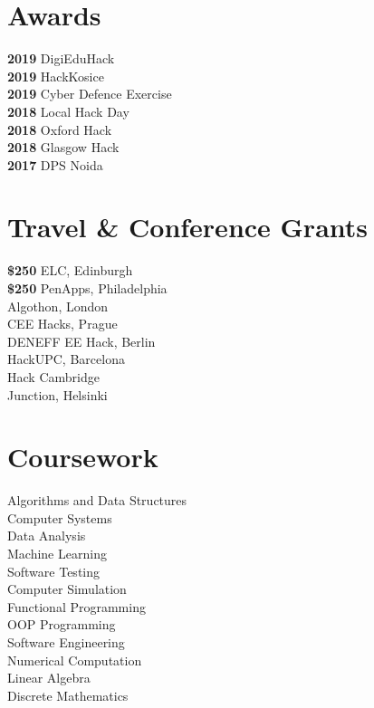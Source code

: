 \documentclass[]{deedy-resume-openfont}
\begin{document}
\begin{minipage}[t]{0.66\textwidth}
%
%


\end{minipage}%
\hfill
\begin{minipage}[t]{0.33\textwidth} 


\section{Awards} 

\textbf{2019 } DigiEduHack \\
\textbf{2019 } HackKosice \\
\textbf{2019 } Cyber Defence Exercise\\
\textbf{2018 } Local Hack Day\\
\textbf{2018 } Oxford Hack \\
\textbf{2018 } Glasgow Hack \\
\textbf{2017 } DPS Noida

\section{Travel \& Conference Grants}

\textbf{\$250 } ELC, Edinburgh \\
\textbf{\$250 } PenApps, Philadelphia \\
\textbf{ } Algothon, London \\
\textbf{ } CEE Hacks, Prague\\
\textbf{ } DENEFF EE Hack, Berlin\\
\textbf{ } HackUPC, Barcelona\\
\textbf{  } Hack Cambridge \\
\textbf{    } Junction, Helsinki


\section{Coursework}
Algorithms and Data Structures \\
Computer Systems \\
Data Analysis \\
Machine Learning \\
Software Testing \\
Computer Simulation \\
Functional Programming \\
OOP Programming \\
Software Engineering \\
Numerical Computation \\
Linear Algebra \\
Discrete Mathematics 


\end{minipage}
\end{document}
